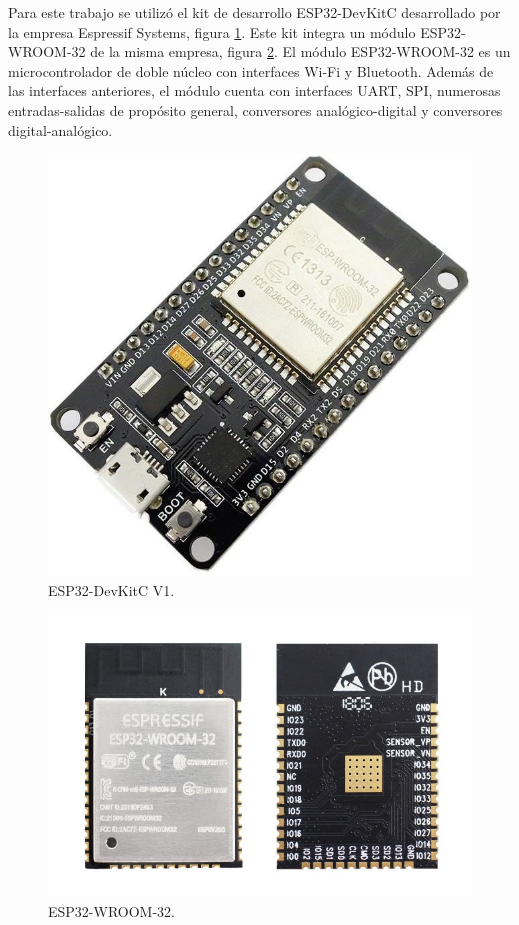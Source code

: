 Para este trabajo se utilizó el kit de desarrollo ESP32-DevKitC \citep{ESP32} desarrollado por la empresa Espressif Systems, figura \ref{fig:ESP32DevKitC}. Este kit integra un módulo ESP32-WROOM-32 \citep{WROOM} de la misma empresa, figura \ref{fig:ESP32WROOM}. El módulo ESP32-WROOM-32 es un microcontrolador de doble núcleo con interfaces Wi-Fi y Bluetooth. Además de las interfaces anteriores, el módulo cuenta con interfaces UART, SPI, numerosas entradas-salidas de propósito general, conversores analógico-digital y conversores digital-analógico.

\begin{figure}[htpb]
	\centering
	\includegraphics[scale=1.2]{./Figures/ESP32DevKit.jpg}
	\caption{ESP32-DevKitC V1.}
	\label{fig:ESP32DevKitC}
\end{figure}

\begin{figure}[htpb]
	\centering
	\includegraphics[scale=.5]{./Figures/esp32-wroom-32-front-back.jpg}
	\caption{ESP32-WROOM-32.}
	\label{fig:ESP32WROOM}
\end{figure}

